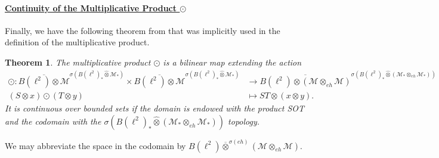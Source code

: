\documentclass[12pt]{article}
\newtheorem{theorem}{Theorem}[section]
\theoremstyle{definition}
\newcommand{\mc}[1]{\mathcal{#1}}
\newcommand{\<}{\langle}
\renewcommand{\>}{\rangle}
\renewcommand{\hat}[1]{\widehat{#1}}
\newcommand{\eh}{\otimes_{eh}}
\begin{document}
\paragraph{\underline{Continuity of the Multiplicative Product $\odot$}}

Finally, we have the following theorem from \cite{gp-obs} that was implicitly used in the definition of the multiplicative product.

\begin{theorem} \label{defn: mult-prod-gp}
    The multiplicative product $\odot$ is a bilinear map extending the action
    \begin{align*}
    \odot : \overline{B(\ell^2) \otimes \mc M}^{\sigma(B(\ell^2)_* \hat \otimes \mc M_*)} \times \overline{B(\ell^2) \otimes \mc M}^{\sigma(B(\ell^2)_* \hat \otimes \mc M_*)} &\to \overline{B(\ell^2) \otimes (\mc M \eh \mc M)}^{\sigma(B(\ell^2)_* \widehat \otimes (\mc M_* \otimes_{eh} \mc M_*))} \\
    (S \otimes x) \odot (T \otimes y) &\mapsto ST \otimes (x \otimes y).
    \end{align*}
   It is continuous over bounded sets if the domain is endowed with the product SOT and the codomain with the $\sigma(B(\ell^2)_* \hat \otimes (\mc M_* \otimes_{eh} \mc M_*))$ topology.
\end{theorem}

 We may abbreviate the space in the codomain by $B(\ell^2) \overline{\otimes}^{\sigma(eh)} (\mc M \eh \mc M)$. 
\end{document}
